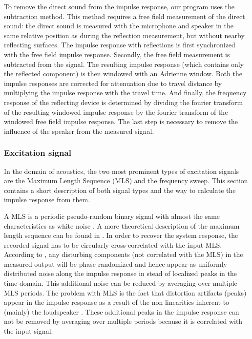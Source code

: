 To remove the direct sound from the impulse response, our program uses the subtraction method. This method requires a free field measurement of the direct sound: the direct sound is measured with the microphone and speaker in the same relative position as during the reflection measurement, but without nearby reflecting surfaces. The impulse response with reflections is first synchronized with the free field impulse response. Secondly, the free field measurement is subtracted from the signal. The resulting impulse response (which contains only the reflected component) is then windowed with an Adrienne window. Both the impulse responses are corrected for attenuation due to travel distance by multiplying the impulse response with the travel time. And finally, the frequency response of the reflecting device is determined by dividing the fourier transform of the resulting windowed impulse response by the fourier transform of the windowed free field impulse response. The last step is necessary to remove the influence of the speaker from the measured signal.



\subsubsection{Excitation signal}\label{exc}
In the domain of acoustics, the two most prominent types of excitation signals are the Maximum Length Sequence (MLS) and the frequency sweep.
This section contains a short description of both signal types and the way to calculate the impulse response from them. 


A MLS is a periodic pseudo-random binary signal with almost the same characteristics as white noise \cite{Stan}. A more theoretical description of the maximum length sequence can be found in \cite{mls}.  In order to recover the system response, the recorded signal has to be circularly cross-correlated with the input MLS. According to \cite{Stan}, any disturbing components (not correlated with the MLS) in the measured output will be phase randomized and hence appear as uniformly distributed noise along the impulse response in stead of localized peaks in the time domain. This additional noise can be reduced by averaging over multiple MLS periods. The problem with MLS is the fact that distortion artifacts (peaks) appear in the impulse response as a result of the non linearities inherent to (mainly) the loudspeaker \cite{Geetere}. These additional peaks in the impulse response can not be removed by averaging over multiple periods because it is correlated with the input signal.

